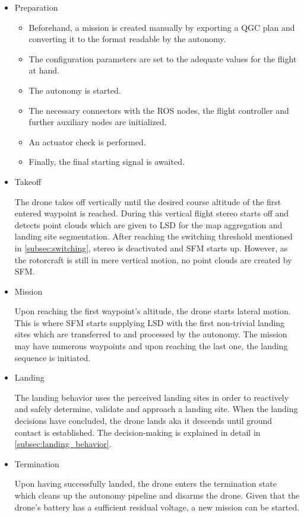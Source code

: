 \begin{itemize}
    \item Preparation
    
        \begin{itemize}
            \item Beforehand, a mission is created manually by exporting a QGC plan and converting it to the format readable by the autonomy.
            \item The configuration parameters are set to the adequate values for the flight at hand.
            \item The autonomy is started.
            \item The necessary connectors with the ROS nodes, the flight controller and further auxiliary nodes are initialized.
            \item An actuator check is performed.
            \item Finally, the final starting signal is awaited.
        \end{itemize}
        

    \item Takeoff
    
    The drone takes off vertically until the desired course altitude of the first entered waypoint is reached. During this vertical flight stereo starts off and detects point clouds which are given to LSD for the map aggregation and landing site segmentation. After reaching the switching threshold mentioned in \cref{subsec:switching}, stereo is deactivated and SFM starts up. However, as the rotorcraft is still in mere vertical motion, no point clouds are created by SFM.

    \item Mission

    Upon reaching the first waypoint's altitude, the drone starts lateral motion. This is where SFM starts supplying LSD with the first non-trivial landing sites which are transferred to and processed by the autonomy. The mission may have numerous waypoints and upon reaching the last one, the landing sequence is initiated.

    \item Landing
    
    The landing behavior uses the perceived landing sites in order to reactively and safely determine, validate and approach a landing site. When the landing decisions have concluded, the drone lands aka it descends until ground contact is established. The decision-making is explained in detail in \cref{subsec:landing_behavior}. 

    \item Termination

    Upon having successfully landed, the drone enters the termination state which cleans up the autonomy pipeline and disarms the drone. Given that the drone's battery has a sufficient residual voltage, a new mission can be started.
\end{itemize}

